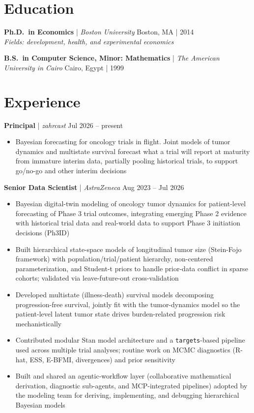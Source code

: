 \documentclass[11pt]{article}
\begin{document}
\section*{Education}

\textbf{Ph.D.\ in Economics} | \textit{Boston University} \hfill Boston, MA | 2014\\
\textit{Fields: development, health, and experimental economics}

\medskip

\textbf{B.S.\ in Computer Science, Minor: Mathematics} | \textit{The American University in Cairo} \hfill Cairo, Egypt | 1999

\section*{Experience}

\textbf{Principal} | \textit{zahrcast} \hfill Jul 2026 -- present
\begin{itemize}
  \item Bayesian forecasting for oncology trials in flight. Joint models of tumor dynamics and multistate survival forecast what a trial will report at maturity from immature interim data, partially pooling historical trials, to support go/no-go and other interim decisions
\end{itemize}

\medskip

\textbf{Senior Data Scientist} | \textit{AstraZeneca} \hfill Aug 2023 -- Jul 2026
\begin{itemize}
  \item Bayesian digital-twin modeling of oncology tumor dynamics for patient-level forecasting of Phase 3 trial outcomes, integrating emerging Phase 2 evidence with historical trial data and real-world data to support Phase 3 initiation decisions (Ph3ID)
  \item Built hierarchical state-space models of longitudinal tumor size (Stein-Fojo framework) with population/trial/patient hierarchy, non-centered parameterization, and Student-t priors to handle prior-data conflict in sparse cohorts; validated via leave-future-out cross-validation
  \item Developed multistate (illness-death) survival models decomposing progression-free survival, jointly fit with the tumor-dynamics model so the patient-level latent tumor state drives burden-related progression risk mechanistically
  \item Contributed modular Stan model architecture and a \texttt{targets}-based pipeline used across multiple trial analyses; routine work on MCMC diagnostics (R-hat, ESS, E-BFMI, divergences) and prior sensitivity
  \item Built and shared an agentic-workflow layer (collaborative mathematical derivation, diagnostic sub-agents, and MCP-integrated pipelines) adopted by the modeling team for deriving, implementing, and debugging hierarchical Bayesian models
\end{itemize}
\end{document}
